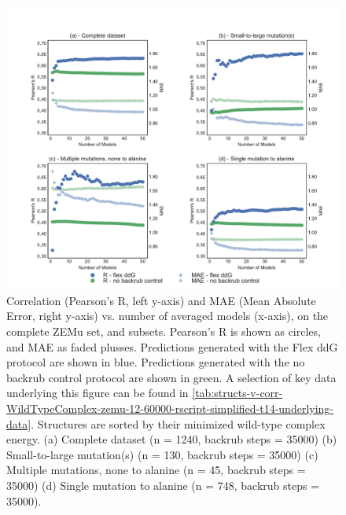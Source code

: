 \begin{figure}
  \includegraphics[width=\textwidth,keepaspectratio]{structs-v-corr-WildTypeComplex-zemu-12-60000-rscript-simplified-t14.pdf}
  \caption[]{
    Correlation (Pearson's R, left y-axis) and MAE (Mean Absolute Error, right y-axis) vs. number of averaged models (x-axis), on the complete ZEMu set, and subsets.
    Pearson's R is shown as circles, and MAE as faded plusses.
Predictions generated with the Flex ddG protocol are shown in blue.
Predictions generated with the no backrub control protocol are shown in green.
    A selection of key data underlying this figure can be found in \cref{tab:structs-v-corr-WildTypeComplex-zemu-12-60000-rscript-simplified-t14-underlying-data}.
    Structures are sorted by their minimized wild-type complex energy. 
    (a) Complete dataset (n = 1240, backrub steps = 35000)
    (b) Small-to-large mutation(s) (n = 130, backrub steps = 35000)
    (c) Multiple mutations, none to alanine (n = 45, backrub steps = 35000)
    (d) Single mutation to alanine (n = 748, backrub steps = 35000).
  } \label{fig:structs-v-corr-WildTypeComplex-zemu-12-60000-rscript-simplified-t14}
\end{figure}
